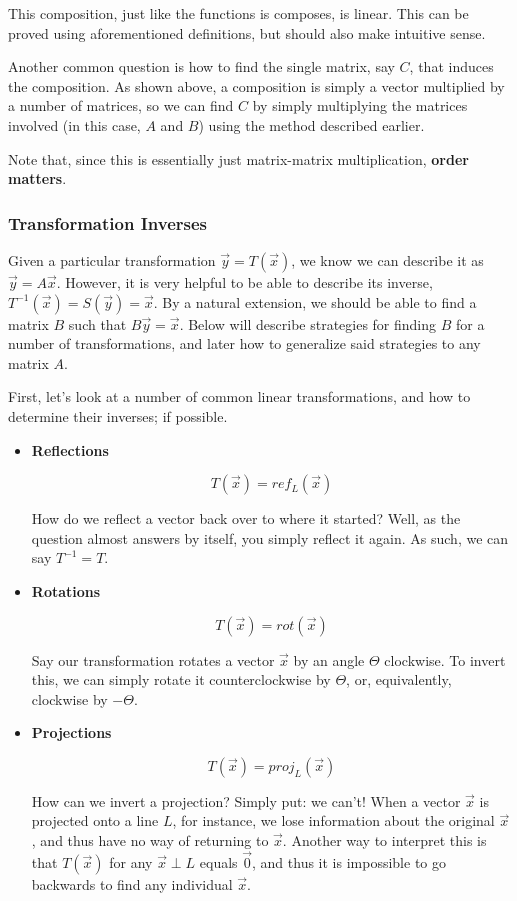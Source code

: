 \documentclass[12pt]{article}
\begin{document}
This composition, just like the functions is composes, is linear. This can be proved using aforementioned definitions, but should also make intuitive sense. 

Another common question is how to find the single matrix, say $C$, that induces the composition. As shown above, a composition is simply a vector multiplied by a number of matrices, so we can find $C$ by simply multiplying the matrices involved (in this case, $A$ and $B$) using the method described earlier.

Note that, since this is essentially just matrix-matrix multiplication, \textbf{order matters}.

\subsubsection{Transformation Inverses}

Given a particular transformation $\vec{y} = T(\vec{x})$, we know we can describe it as $\vec{y}=A\vec{x}$. However, it is very helpful to be able to describe its inverse, $T^{-1}(\vec{x}) = S(\vec{y}) = \vec{x}$. By a natural extension, we should be able to find a matrix $B$ such that $B \vec{y} = \vec{x}$. Below will describe strategies for finding $B$ for a number of transformations, and later how to generalize said strategies to any matrix $A$.

First, let's look at a number of common linear transformations, and how to determine their inverses; if possible.

\begin{itemize}
    \item \textbf{Reflections}
    
    \[
    T(\vec{x}) = ref_L(\vec{x})
    \]
    
    How do we reflect a vector back over to where it started? Well, as the question almost answers by itself, you simply reflect it again. As such, we can say $T^{-1} = T$.
    
    \item \textbf{Rotations}
    
    \[
    T(\vec{x}) = rot(\vec{x})
    \]
    
    Say our transformation rotates a vector $\vec{x}$ by an angle $\Theta$ clockwise. To invert this, we can simply rotate it counterclockwise by $\Theta$, or, equivalently, clockwise by $-\Theta$.
    
    \item \textbf{Projections}
    
    \[
    T(\vec{x}) = proj_L(\vec{x})
    \]
    
    How can we invert a projection? Simply put: we can't! When a vector $\vec{x}$ is projected onto a line $L$, for instance, we lose information about the original $\vec{x}$, and thus have no way of returning to $\vec{x}$. Another way to interpret this is that $T(\vec{x})$ for any $\vec{x} \perp L$ equals $\vec{0}$, and thus it is impossible to go backwards to find any individual $\vec{x}$.
\end{itemize}
\end{document}
